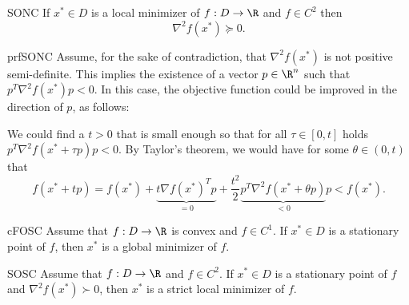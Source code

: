 \begin{theo}{SONC}
    If $x^* \in D$ is a local minimizer of $f: D \to \R$ and $f \in C^2$ then
    \begin{equation*}
        \nabla^2 f(x^*) \succeq 0.
    \end{equation*}
    \vspace*{-0.5cm}
\end{theo}

\begin{prf}{prfSONC}
    Assume, for the sake of contradiction, that $\nabla^2 f(x^*)$ is not positive semi-definite. This implies the existence of a vector $p \in \R^n$ such that $p^T \nabla^2 f(x^*) p < 0$. In this case, the objective function could be improved in the direction of $p$, as follows:
    
    \begin{framed}
        We could find a $t > 0$ that is small enough so that for all $\tau \in [0,t]$ holds $ p^T \nabla^2 f(x^* + \tau p) p < 0$. By Taylor's theorem, we would have for some $\theta \in (0,t)$ that
        \begin{equation*}
            f(x^* + t p) = f(x^*) + \underbrace{t \nabla {f(x^*)}^T p}_{=0} + \frac{t^2}{2} \underbrace{p^T \nabla^2 f(x^* + \theta p)}_{<0} p < f(x^*).
        \end{equation*}
        \vspace{-0.3cm}
    \end{framed}
    \vspace{-0.3cm}
\end{prf}

\begin{theo}{cFOSC}
    Assume that $f: D \to \R$ is convex and $f \in C^1$. If $x^* \in D$ is a stationary point of $f$, then $x^*$ is a global minimizer of $f$.
\end{theo}

\begin{theo}{SOSC}
    Assume that $f: D \to \R$ and $f \in C^2$. If $x^* \in D$ is a stationary point of $f$ and $\nabla^2 f(x^*) \succ 0$, then $x^*$ is a strict local minimizer of $f$.
\end{theo}

